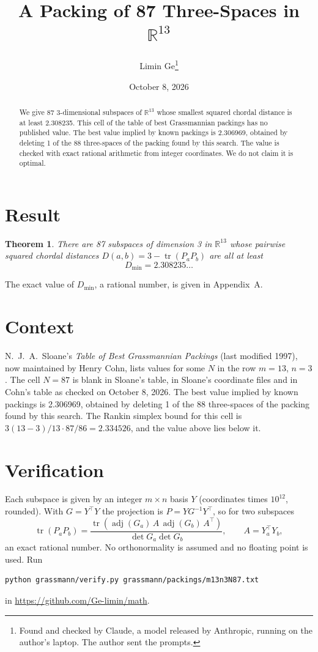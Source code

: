 \documentclass[11pt,a4paper]{article}
\title{A Packing of 87 Three-Spaces in $\mathbb{R}^{13}$}
\author{Limin Ge\thanks{Found and checked by Claude, a model released by Anthropic, running on the author's laptop. The author sent the prompts.}}
\date{October 8, 2026}
\newtheorem*{theorem}{Theorem}
\begin{document}
\maketitle
\begin{abstract}
We give 87 3-dimensional subspaces of $\mathbb{R}^{13}$ whose smallest squared chordal distance is at least 2.308235. This cell of the table of best Grassmannian packings has no published value. The best value implied by known packings is 2.306969, obtained by deleting 1 of the 88 three-spaces of the packing found by this search. The value is checked with exact rational arithmetic from integer coordinates. We do not claim it is optimal.
\end{abstract}

\section{Result}
\begin{theorem}
There are 87 subspaces of dimension 3 in $\mathbb{R}^{13}$ whose pairwise squared chordal distances $D(a,b) = 3 - \operatorname{tr}(P_aP_b)$ are all at least
\[ D_{\min} = 2.308235\ldots \]
\end{theorem}
The exact value of $D_{\min}$, a rational number, is given in Appendix~A.


\section{Context}
N.~J.~A.~Sloane's \emph{Table of Best Grassmannian Packings} (last modified 1997), now maintained by Henry Cohn, lists values for some $N$ in the row $m=13$, $n=3$. The cell $N=87$ is blank in Sloane's table, in Sloane's coordinate files and in Cohn's table as checked on October 8, 2026. The best value implied by known packings is 2.306969, obtained by deleting 1 of the 88 three-spaces of the packing found by this search. The Rankin simplex bound for this cell is $3(13-3)/13\cdot 87/86 = 2.334526$, and the value above lies below it.


\section{Verification}
Each subspace is given by an integer $m\times n$ basis $Y$ (coordinates times $10^{12}$, rounded). With $G=Y^\top Y$ the projection is $P=YG^{-1}Y^\top$, so for two subspaces
\[ \operatorname{tr}(P_aP_b)=\frac{\operatorname{tr}(\operatorname{adj}(G_a)\,A\,\operatorname{adj}(G_b)\,A^\top)}{\det G_a\det G_b},\qquad A=Y_a^\top Y_b, \]
an exact rational number. No orthonormality is assumed and no floating point is used. Run
\begin{verbatim}
python grassmann/verify.py grassmann/packings/m13n3N87.txt
\end{verbatim}
in \url{https://github.com/Ge-limin/math}.
\end{document}
